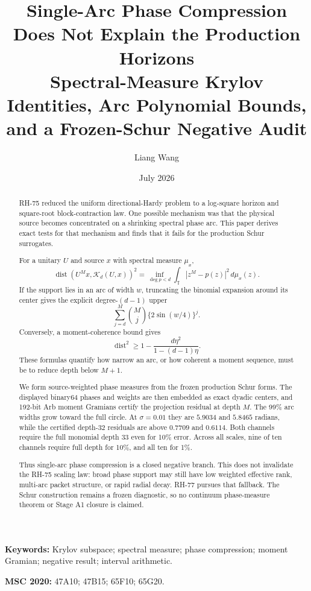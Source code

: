\documentclass[11pt]{article}
\title{Single-Arc Phase Compression Does Not Explain the Production Horizons\\
\large Spectral-Measure Krylov Identities, Arc Polynomial Bounds, and a Frozen-Schur Negative Audit}
\author{Liang Wang}
\date{July 2026}
\newcommand{\K}{\mathcal K}
\begin{document}
\maketitle

\begin{abstract}
RH-75 reduced the uniform directional-Hardy problem to a log-square horizon
and square-root block-contraction law.  One possible mechanism was that the
physical source becomes concentrated on a shrinking spectral phase arc.  This
paper derives exact tests for that mechanism and finds that it fails for the
production Schur surrogates.

For a unitary $U$ and source $x$ with spectral measure $\mu_x$,
\[
 \operatorname{dist}(U^Mx,\K_d(U,x))^2
 =\inf_{\deg p<d}\int_{\mathbb T}|z^M-p(z)|^2\,d\mu_x(z).
\]
If the support lies in an arc of width $w$, truncating the binomial expansion
around its center gives the explicit degree-$(d-1)$ upper
\[
 \sum_{j=d}^{M}\binom Mj\{2\sin(w/4)\}^j.
\]
Conversely, a moment-coherence bound gives
\[
 \operatorname{dist}^2\ge
 1-\frac{d\eta^2}{1-(d-1)\eta}.
\]
These formulas quantify how narrow an arc, or how coherent a moment sequence,
must be to reduce depth below $M+1$.

We form source-weighted phase measures from the frozen production Schur forms.
The displayed binary64 phases and weights are then embedded as exact dyadic
centers, and 192-bit Arb moment Gramians certify the projection residual at
depth $M$.  The 99\% arc widths grow toward the full circle.  At
$\sigma=0.01$ they are $5.9034$ and $5.8465$ radians, while the certified
depth-$32$ residuals are above $0.7709$ and $0.6114$.  Both channels require
the full monomial depth $33$ even for 10\% error.  Across all scales, nine of
ten channels require full depth for 10\%, and all ten for 1\%.

Thus single-arc phase compression is a closed negative branch.  This does not
invalidate the RH-75 scaling law: broad phase support may still have low
weighted effective rank, multi-arc packet structure, or rapid radial decay.
RH-77 pursues that fallback.  The Schur construction remains a frozen
diagnostic, so no continuum phase-measure theorem or Stage A1 closure is
claimed.
\end{abstract}

\noindent\textbf{Keywords:} Krylov subspace; spectral measure; phase
compression; moment Gramian; negative result; interval arithmetic.

\medskip
\noindent\textbf{MSC 2020:} 47A10; 47B15; 65F10; 65G20.
\end{document}
